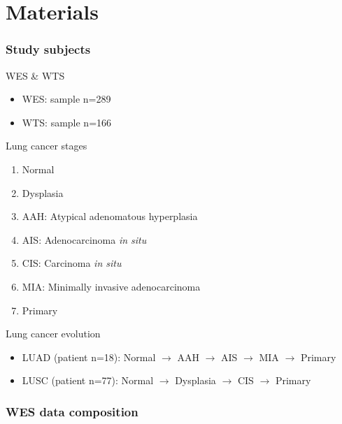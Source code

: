 \documentclass{beamer}
\begin{document}
    \section{Materials}
        \begin{frame}[allowframebreaks]
            \frametitle{Study subjects}

            \begin{block}{WES \& WTS}
                \begin{itemize}
                    \item WES: sample n=289
                    \item WTS: sample n=166
                \end{itemize}
            \end{block}

            \begin{block}{Lung cancer stages}
                \begin{enumerate}
                    \item Normal
                    \item Dysplasia
                    \item AAH: Atypical adenomatous hyperplasia
                    \item AIS: Adenocarcinoma \textit{in situ}
                    \item CIS: Carcinoma \textit{in situ}
                    \item MIA: Minimally invasive adenocarcinoma
                    \item Primary
                \end{enumerate}
            \end{block}

            \begin{block}{Lung cancer evolution}
                \begin{itemize}
                    \item LUAD (patient n=18): Normal $\rightarrow$ AAH $\rightarrow$ AIS $\rightarrow$ MIA $\rightarrow$ Primary
                    \item LUSC (patient n=77): Normal $\rightarrow$ Dysplasia $\rightarrow$ CIS $\rightarrow$ Primary
                \end{itemize}
            \end{block}
        \end{frame}

        \begin{frame}
            \frametitle{WES data composition}

            \begin{table}
                \caption{Number of WES samples}
                
            \end{table}
        \end{frame}
\end{document}
